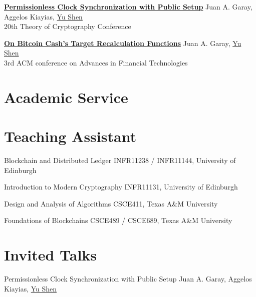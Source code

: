 \documentclass[11pt, a4paper, sans]{moderncv} %
\begin{document}
{\textbf{\href{https://eprint.iacr.org/2022/1220.pdf}{Permissionless Clock Synchronization with Public Setup}}}
{}
{}
{}
{\normalsize Juan A. Garay, Aggelos Kiayias, \underline{Yu Shen} \\ 20th Theory of Cryptography Conference}

{\textbf{\href{https://eprint.iacr.org/2021/143.pdf}{On Bitcoin Cash's Target Recalculation Functions}}}
{}
{}
{}
{\normalsize Juan A. Garay, \underline{Yu Shen} \\ 3rd ACM conference on Advances in Financial Technologies}

\section{Academic Service}


\section{Teaching Assistant}

{Blockchain and Distributed Ledger}
{}
{}
{}
{INFR11238 / INFR11144, University of Edinburgh}

{Introduction to Modern Cryptography}
{}
{}
{}
{INFR11131, University of Edinburgh}

{Design and Analysis of Algorithms}
{}
{}
{}
{CSCE411, Texas A\&M University}

{Foundations of Blockchains}
{}
{}
{}
{CSCE489 / CSCE689, Texas A\&M University
}

\section{Invited Talks}

{Permissionless Clock Synchronization with Public Setup}
{}
{}
{}
{\normalsize Juan A. Garay, Aggelos Kiayias, \underline{Yu Shen}}
\end{document}
